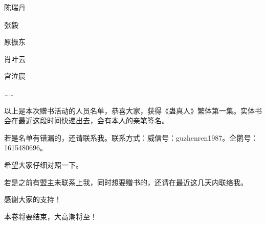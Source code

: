 \begin{this_body}
陈瑞丹

张毅

原振东

肖叶云

宫泣宸

……

以上是本次赠书活动的人员名单，恭喜大家，获得《蛊真人》繁体第一集。实体书会在最近这段时间快递出去，会有本人的亲笔签名。

若是名单有错漏的，还请联系我。联系方式：威信号：guzhenren1987。企鹅号：1615480696。

希望大家仔细对照一下。

若是之前有盟主未联系上我，同时想要赠书的，还请在最近这几天内联络我。

感谢大家的支持！

本卷将要结束，大高潮将至！

\end{this_body}

